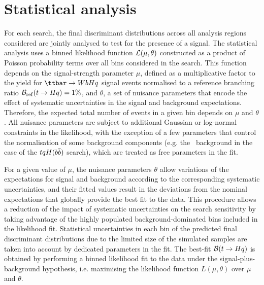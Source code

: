 \section{Statistical analysis}
\label{sec:stat_analysis}

For each search, the final discriminant distributions across all analysis regions considered are jointly analysed to test for the 
presence of a signal. The statistical analysis uses a binned likelihood function ${\cal L}(\mu,\theta)$ constructed as
a product of Poisson probability terms over all bins considered in the search. This function depends
on the signal-strength parameter $\mu$, defined as a multiplicative factor to the yield for $\Hq$ signal events
normalised to a reference branching ratio $\mathcal{B}_{\mathrm{ref}}(t\to Hq)=1\%$,
and $\theta$, a set of nuisance parameters that encode the effect of systematic uncertainties in the signal and background expectations. 
Therefore, the expected total number of events in a given bin depends on $\mu$ and $\theta$. 
All nuisance parameters are subject to additional Gaussian or log-normal constraints in the likelihood, with the exception of a few parameters 
that control the normalisation of some background components (e.g. the \ttbin\ background in the case of the $tqH(b\bar{b})$ search), which 
are treated as free parameters in the fit.

For a given value of $\mu$, the nuisance parameters $\theta$ allow variations of the expectations for signal and background
according to the corresponding systematic uncertainties, and their fitted values result in the deviations from
the nominal expectations that globally provide the best fit to the data.
This procedure allows a reduction of the impact of systematic uncertainties on 
the search sensitivity by taking advantage of the highly populated background-dominated bins included in the likelihood fit.
Statistical uncertainties in each bin of the predicted final discriminant distributions due to the limited size of the simulated samples 
are taken into account by dedicated parameters in the fit.     
The best-fit $\mathcal{B}(t\to Hq)$ is obtained by performing a binned likelihood fit to the data under the signal-plus-background
hypothesis, i.e. maximising the likelihood function $L(\mu,\theta)$ over $\mu$ and $\theta$.


